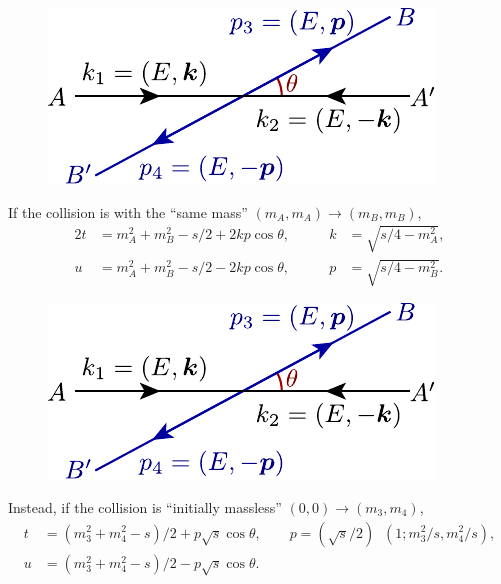 \documentclass[CheatSheet]{subfiles}
\begin{document}
\begin{figure}
 \includegraphics[width=\linewidth,page=1]{figs/collision.pdf}
\end{figure}

\noindent
If the collision is with the ``same mass'' $(m_A,m_A)\to (m_B,m_B)$,
\begin{alignat*}{2}
t &= m_A^2+m_B^2 - s/2+2kp\cos\theta,\qquad
&k&={\sqrt{s/4-m_A^2}},\\
u &= m_A^2+m_B^2 - s/2-2kp\cos\theta,
&p&={\sqrt{s/4-m_B^2}}.
\end{alignat*}

\begin{figure}
 \includegraphics[width=\linewidth,page=2]{figs/collision.pdf}
\end{figure}

\noindent
Instead, if the collision is ``initially massless'' $(0,0)\to (m_3,m_4)$,
\begin{align*}
 t &= (m_3^2+m_4^2-s)/2+p\sqrt{s}\cos\theta,\qquad
 p = (\sqrt{s}/2)\mathop{\lambda^{1/2}}\left(1;m_3^2/s,{m_4^2}/{s}\right),\\
 u &= (m_3^2+m_4^2-s)/2-p\sqrt{s}\cos\theta.\\
\end{align*}

\newpage
\end{document}
